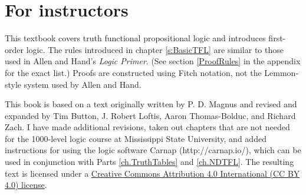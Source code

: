 \section{For instructors}

This textbook covers truth functional propositional logic and introduces first-order logic. The rules introduced in chapter \ref{s:BasicTFL} are similar to those used in Allen and Hand's \textit{Logic Primer}. (See section \ref{ProofRules} in the appendix for the exact list.) Proofs are constructed using Fitch notation, not the Lemmon-style system used by Allen and Hand.

This book is based on a text originally written by P. D. Magnus and revised and expanded by Tim Button, J. Robert Loftis, Aaron Thomas-Bolduc, and Richard Zach. I have made additional revisions, taken out chapters that are not needed for the 1000-level logic course at Mississippi State University, and added instructions for using the logic software Carnap (http://carnap.io/), which can be used in conjunction with Parts \ref{ch.TruthTables} and \ref{ch.NDTFL}. The resulting text is licensed under a \href{https://creativecommons.org/licenses/by/4.0/}{Creative Commons Attribution 4.0 International (CC BY 4.0) license}.

 